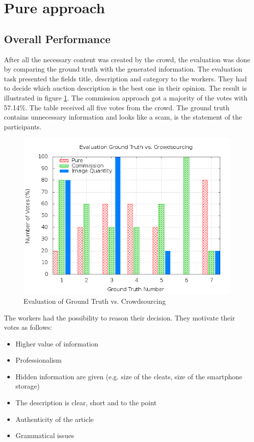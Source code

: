 \section{Pure approach}
\subsection{Overall Performance}
After all the necessary content was created by the crowd, the evaluation was done by comparing the ground truth with the generated information. The evaluation task presented the fields title, description and category to the workers. They had to decide which auction description is the best one in their opinion. The result is illustrated in figure \ref{crowdsourcing_eval}. The commission approach got a majority of the votes with 57.14\%. The table received all five votes from the crowd. The ground truth contains unnecessary information and looks like a scam, is the statement of the participants.\\
\begin{figure}
\centering
\includegraphics[scale=0.55]{images/plots/crowdsourcing/plot_evaluation_all.png}
\caption{Evaluation of Ground Truth vs. Crowdsourcing}
\label{crowdsourcing_eval}
\end{figure}
The workers had the possibility to reason their decision. They motivate their votes as follows: 
\begin{itemize}
	\item Higher value of information 
	\item Professionalism 
	\item Hidden information are given (e.g. size of the cleats, size of the smartphone storage) 
	\item The description is clear, short and to the point 
	\item Authenticity of the article 
	\item Grammatical issues 
\end{itemize}

